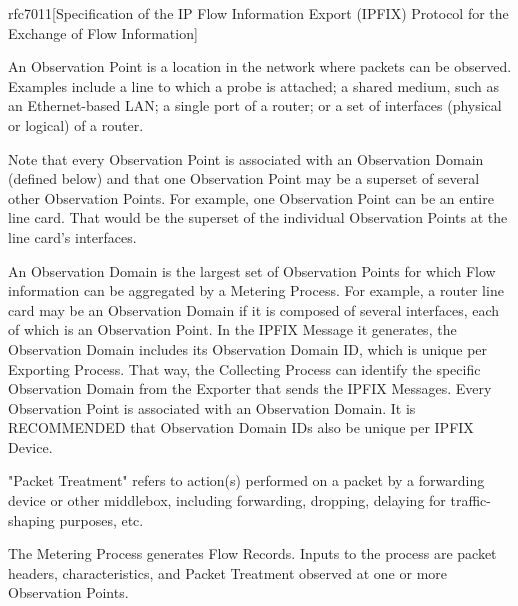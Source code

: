 \begin{displaycquote}{rfc7011}[Specification of the IP Flow Information Export (IPFIX) Protocol for the Exchange of Flow Information]

    \begin{description}[style=nextline]
        \item[Observation Point]
      An Observation Point is a location in the network where packets
      can be observed.  Examples include a line to which a probe is
      attached; a shared medium, such as an Ethernet-based LAN; a single
      port of a router; or a set of interfaces (physical or logical) of
      a router.

      Note that every Observation Point is associated with an
      Observation Domain (defined below) and that one Observation Point
      may be a superset of several other Observation Points.  For
      example, one Observation Point can be an entire line card.  That
      would be the superset of the individual Observation Points at the
      line card's interfaces.
      
        \item[Observation Domain]
      An Observation Domain is the largest set of Observation Points for
      which Flow information can be aggregated by a Metering Process.
      For example, a router line card may be an Observation Domain if it
      is composed of several interfaces, each of which is an Observation
      Point.  In the IPFIX Message it generates, the Observation Domain
      includes its Observation Domain ID, which is unique per Exporting
      Process.  That way, the Collecting Process can identify the
      specific Observation Domain from the Exporter that sends the IPFIX
      Messages.  Every Observation Point is associated with an
      Observation Domain.  It is RECOMMENDED that Observation Domain IDs
      also be unique per IPFIX Device.

        \item[Packet Treatment]
      "Packet Treatment" refers to action(s) performed on a packet by a
      forwarding device or other middlebox, including forwarding,
      dropping, delaying for traffic-shaping purposes, etc.

        \item[Metering Process] 

      The Metering Process generates Flow Records.  Inputs to the
      process are packet headers, characteristics, and Packet Treatment
      observed at one or more Observation Points.


\end{description}
\end{displaycquote}
